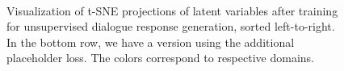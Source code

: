 \begin{figure}[h]
\hfill
{}\\
\caption{Visualization of t-SNE projections of latent variables after training for unsupervised dialogue response generation, sorted left-to-right. In the bottom row, we have a version using the additional placeholder loss. The colors correspond to respective domains.}
\label{05:fig:ft-layers}
\end{figure}

